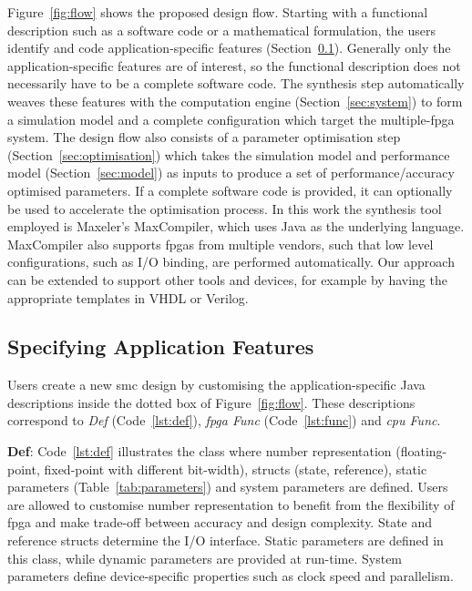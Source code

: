 Figure~\ref{fig:flow} shows the proposed design flow.
Starting with a functional description such as a software code or a mathematical formulation, the users identify and code application-specific features (Section~\ref{sec:kernel}). 
Generally only the application-specific features are of interest, so the functional description does not necessarily have to be a complete software code. 
The synthesis step automatically weaves these features with the computation engine (Section~\ref{sec:system}) to form a simulation model and a complete configuration which target the multiple-\gls{fpga} system.
The design flow also consists of a parameter optimisation step (Section~\ref{sec:optimisation}) which takes the simulation model and performance model (Section~\ref{sec:model}) as inputs to produce a set of performance/accuracy optimised parameters.
If a complete software code is provided, it can optionally be used to accelerate the optimisation process.
In this work the synthesis tool employed is Maxeler's MaxCompiler, which uses Java as the underlying language. 
MaxCompiler also supports \gls{fpga}s from multiple vendors, such that low level configurations, such as I/O binding, are performed automatically.
Our approach can be extended to support other tools and devices, for example by having the appropriate templates in VHDL or Verilog.

\subsection{Specifying Application Features}
\label{sec:kernel}

Users create a new \gls{smc} design by customising the application-specific Java descriptions inside the dotted box of Figure~\ref{fig:flow}.
These descriptions correspond to \textit{Def} (Code~\ref{lst:def}), \textit{\gls{fpga} Func} (Code~\ref{lst:func}) and \textit{\gls{cpu} Func}.

\textbf{Def}: Code~\ref{lst:def} illustrates the class where number representation (floating-point, fixed-point with different bit-width), structs (state, reference), static parameters (Table~\ref{tab:parameters}) and system parameters are defined.
Users are allowed to customise number representation to benefit from the flexibility of \gls{fpga} and make trade-off between accuracy and design complexity.
State and reference structs determine the I/O interface.
Static parameters are defined in this class, while dynamic parameters are provided at run-time.
System parameters define device-specific properties such as clock speed and parallelism.

